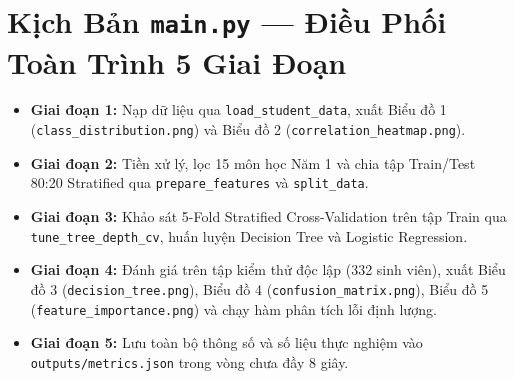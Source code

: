 \documentclass[12pt,a4paper]{article}
\begin{document}
\section{Kịch Bản \texttt{main.py} --- Điều Phối Toàn Trình 5 Giai Đoạn}
\begin{itemize}
    \item \textbf{Giai đoạn 1:} Nạp dữ liệu qua \texttt{load\_student\_data}, xuất Biểu đồ 1 (\texttt{class\_distribution.png}) và Biểu đồ 2 (\texttt{correlation\_heatmap.png}).
    \item \textbf{Giai đoạn 2:} Tiền xử lý, lọc 15 môn học Năm 1 và chia tập Train/Test 80:20 Stratified qua \texttt{prepare\_features} và \texttt{split\_data}.
    \item \textbf{Giai đoạn 3:} Khảo sát 5-Fold Stratified Cross-Validation trên tập Train qua \texttt{tune\_tree\_depth\_cv}, huấn luyện Decision Tree và Logistic Regression.
    \item \textbf{Giai đoạn 4:} Đánh giá trên tập kiểm thử độc lập (332 sinh viên), xuất Biểu đồ 3 (\texttt{decision\_tree.png}), Biểu đồ 4 (\texttt{confusion\_matrix.png}), Biểu đồ 5 (\texttt{feature\_importance.png}) và chạy hàm phân tích lỗi định lượng.
    \item \textbf{Giai đoạn 5:} Lưu toàn bộ thông số và số liệu thực nghiệm vào \texttt{outputs/metrics.json} trong vòng chưa đầy 8 giây.
\end{itemize}
\end{document}
